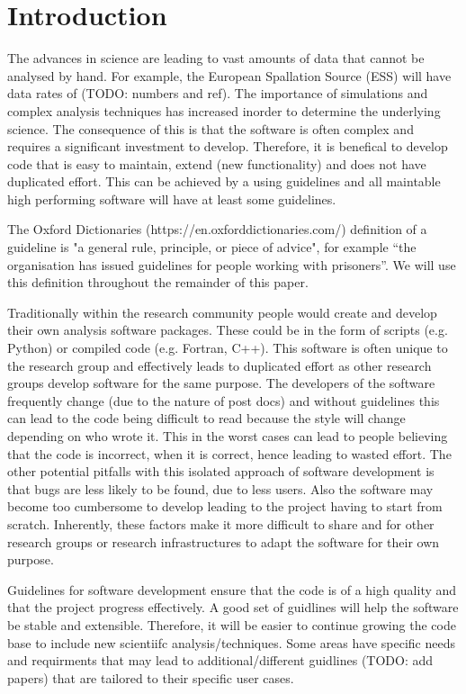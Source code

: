 \documentclass[jnr]{iosart2x}
\begin{document}

\section{Introduction}
\label{Introduction}

The advances in science are leading to vast amounts of data that cannot be analysed by hand.
For example, the European Spallation Source (ESS) will have data rates of (TODO: numbers and ref).
The importance of simulations and complex analysis techniques has increased inorder to determine the underlying science.
The consequence of this is that the software is often complex and requires a significant investment to develop.
Therefore, it is benefical to develop code that is easy to maintain, extend (new functionality) and does not have duplicated effort.
This can be achieved by a using guidelines and all maintable high performing software will have at least some guidelines.

The Oxford Dictionaries (https://en.oxforddictionaries.com/) definition of a guideline is "a general rule, principle, or piece of advice", for example “the organisation has issued guidelines for people working with prisoners”.
We will use this definition throughout the remainder of this paper.

Traditionally within the research community people would create and develop their own analysis software packages.
These could be in the form of scripts (e.g. Python) or compiled code (e.g. Fortran, C++).
This software is often unique to the research group and effectively leads to duplicated effort as other research groups develop software for the same purpose.
The developers of the software frequently change (due to the nature of post docs) and without guidelines this can lead to the code being difficult to read because the style will change depending on who wrote it.
This in the worst cases can lead to people believing that the code is incorrect, when it is correct, hence leading to wasted effort.
The other potential pitfalls with this isolated approach of software development is that bugs are less likely to be found, due to less users.
Also the software may become too cumbersome to develop leading to the project having to start from scratch.
Inherently, these factors make it more difficult to share and for other research groups or research infrastructures to adapt the software for their own purpose.

Guidelines for software development ensure that the code is of a high quality and that the project progress effectively.
A good set of guidlines will help the software be stable and extensible.
Therefore, it will be easier to continue growing the code base to include new scientiifc analysis/techniques.
Some areas have specific needs and requirments that may lead to additional/different guidlines \cite{} (TODO: add papers) that are tailored to their specific user cases.
\end{document}
